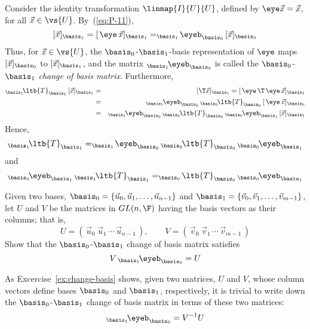 Consider the identity transformation $\linmap{I}{U}{U}$,
defined by $\eye\vec{x} = \vec{x}$, for all $\vec{x}\in \vs{U}$.  
By~(\ref{eq:P-11}), 
\[[\vec{x}]_{\basis_1} = [\, \eye\, \vec{x}]_{\basis_1} =
_{\basis_1}\!\eyeb_{\basis_0} \, [\vec{x}]_{\basis_0}\]
Thus, for $\vec{x}\in \vs{U}$, the $\basis_0$-$\basis_1$-basis representation
of $\eye$ maps $[\vec{x}]_{\basis_0}$ to $[\vec{x}]_{\basis_1}$, and 
the matrix $_{\basis_1}\!\eyeb_{\basis_0}$ is called the $\basis_0$-$\basis_1$
{\it change of basis matrix}.  Furthermore,
\begin{eqnarray*} 
_{\basis_1}\!\ltb{T}_{\basis_1}\, [\vec{x}]_{\basis_1} 
&=& [\T\vec{x}]_{\basis_1} = [\,\eye\, \T\, \eye \, \vec{x}]_{\basis_1}\\
&=&_{\basis_1}\!\eyeb_{\basis_0} \,  _{\basis_0}\!\ltb{T}_{\basis_0} \, [\,\eye \, \vec{x}]_{\basis_0}\\
&=&_{\basis_1}\!\eyeb_{\basis_0} \,_{\basis_0}\!\ltb{T}_{\basis_0} \,_{\basis_0}\!\eyeb_{\basis_1}\,[\vec{x}]_{\basis_1}
\end{eqnarray*}
Hence,
\[
_{\basis_1}\!\ltb{T}_{\basis_1} = _{\basis_1}\!\eyeb_{\basis_0} \,_{\basis_0}\!\ltb{T}_{\basis_0} \,_{\basis_0}\!\eyeb_{\basis_1}
\]
and
\[
_{\basis_0}\!\eyeb_{\basis_1} \,_{\basis_1}\!\ltb{T}_{\basis_1} =
_{\basis_0}\!\ltb{T}_{\basis_0} \,_{\basis_0}\!\eyeb_{\basis_1}
\]

\begin{exercise}\label{ex:change-basis}
Given two bases, $\basis_0 = \{\vec{u}_0, \vec{u}_1, \ldots, \vec{u}_{n-1}\}$ and
 $\basis_1 = \{\vec{v}_0, \vec{v}_1, \ldots, \vec{v}_{m-1}\}$, let $U$ and $V$
 be the matrices in $GL(n, \F)$ having the basis vectors as their columns; that is, 
\[U = (\,\vec{u}_0 \; \vec{u}_1\, \cdots\, \vec{u}_{n-1}\,), \qquad
V = (\,\vec{v}_0 \; \vec{v}_1 \,\cdots \,\vec{v}_{m-1}\,)\]
Show that the $\basis_0$-$\basis_1$ change of basis matrix satisfies
\begin{equation}\label{eq:I-14}
V \, _{\basis_1}\!\eyeb_{\basis_0} = U
\end{equation}
\end{exercise}
As Excercise~\ref{ex:change-basis} shows, given two matrices, $U$ and $V$, whose
column vectors define bases $\basis_0$ and $\basis_1$, respectively,
it is trivial to write down the $\basis_0$-$\basis_1$ change of basis matrix in
terms of these two matrices:
\[
 _{\basis_1}\!\eyeb_{\basis_0} =  V^{-1}U
\]


